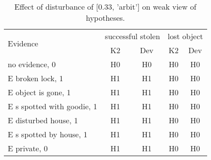 \begin{table}\begin{tabular}{l|cc|cc}\toprule\multirow{2}{*}{Evidence} & \multicolumn{2}{c}{successful stolen}& \multicolumn{2}{c}{lost object}\\& {K2} & {Dev}& {K2} & {Dev}\\\midrule
no evidence, 0 & H0&H0&H0&H0\\E broken lock, 1 & H1&H1&H0&H0\\E object is gone, 1 & H1&H1&H0&H0\\E s spotted with goodie, 1 & H1&H1&H0&H0\\E disturbed house, 1 & H1&H1&H0&H0\\E s spotted by house, 1 & H1&H1&H0&H0\\E private, 0 & H1&H1&H0&H0\\\bottomrule\end{tabular}\caption{Effect of disturbance of [0.33, 'arbit'] on weak view of hypotheses.}\end{table}